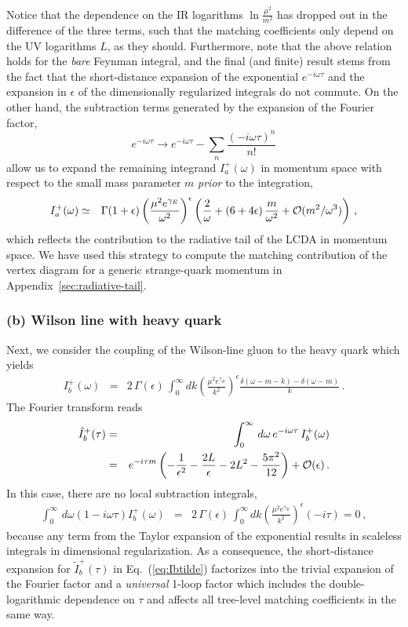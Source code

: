 \documentclass[a4paper,11pt]{article}
\begin{document}
Notice that the dependence on the IR logarithms $\ln \frac{\mu^2}{m^2}$ 
has dropped out in the difference of the three terms, such that the matching coefficients only depend on the UV logarithms $L$, as they should.
Furthermore, note that the above relation holds for the \emph{bare} Feynman integral, and the final (and finite) result stems from the fact that the 
short-distance expansion of the exponential $e^{-i\omega\tau}$ and the expansion in $\epsilon$ of the dimensionally regularized integrals do not commute.
On the other hand, the subtraction terms generated by the expansion of the Fourier factor,
$$
 e^{-i \omega \tau} \to e^{-i \omega \tau} - \sum_n \frac{(-i\omega \tau)^n}{n!} 
$$
allow us to expand the remaining integrand $I_a^+(\omega)$ in momentum space with respect to the small mass parameter $m$ \emph{prior} to the integration,
\begin{eqnarray} 
  I_a^+(\omega) &\simeq & \Gamma(1+\epsilon) \left( \frac{\mu^2 e^{\gamma_E}}{\omega^2} \right)^\epsilon \left( \frac{2}{\omega} + (6+4\epsilon) \, 
   \frac{m}{\omega^2} + {\cal O}(m^2/\omega^3)\right) \,,
\end{eqnarray}
which reflects the contribution to the radiative tail of the LCDA in momentum space.
We have used this strategy to compute the matching contribution of the vertex diagram for a generic strange-quark momentum in Appendix~\ref{sec:radiative-tail}.


\subsubsection*{(b) Wilson line with heavy quark}

Next, we consider the coupling of the Wilson-line gluon to the heavy quark which yields
\cite{Bell:2008er} 
\begin{eqnarray}
	I_b^+(\omega) &=& 2 \, \Gamma(\epsilon) \, \int_0^\infty dk 
	\left( \frac{\mu^2 e^{\gamma_E}}{k^2} \right)^\epsilon 
	\frac{\delta(\omega-m-k)-\delta(\omega-m)}{k} \,.
\end{eqnarray}
The Fourier transform reads
\begin{eqnarray}
	\tilde I_b^+(\tau) &=& \int_0^\infty \, d\omega \, e^{-i\omega\tau} \, I_b^
	+(\omega) 
	\cr 
   &=& e^{-i\tau m}
	\left( -\frac{1}{\epsilon^2}
	- \frac{2L}{\epsilon}
	- 2 L^2 - \frac{5\pi^2}{12} \right) 
	+ \mathcal{O}(\epsilon) \,.
    \label{eq:Ibtilde}
\end{eqnarray}
%
In this case, there are no local subtraction integrals,
\begin{eqnarray} 
\int_0^\infty \, d\omega \left(1 - i \omega\tau  \right) I_b^
	+(\omega) 
  &=& 2 \, \Gamma(\epsilon) \, \int_0^\infty dk 
	\left( \frac{\mu^2 e^{\gamma_E}}{k^2} \right)^\epsilon
 \left( -i \tau  \right) = 0 \,,
\end{eqnarray}
because any term from the Taylor expansion of the exponential results in scaleless integrals in dimensional regularization.
As a consequence, the short-distance expansion for $\tilde I_b^+(\tau)$ in Eq.~(\ref{eq:Ibtilde}) factorizes into the trivial expansion of the Fourier factor and a \emph{universal} 
1-loop factor which includes the double-logarithmic dependence on $\tau$ and affects all tree-level matching coefficients in the same way.
\end{document}

